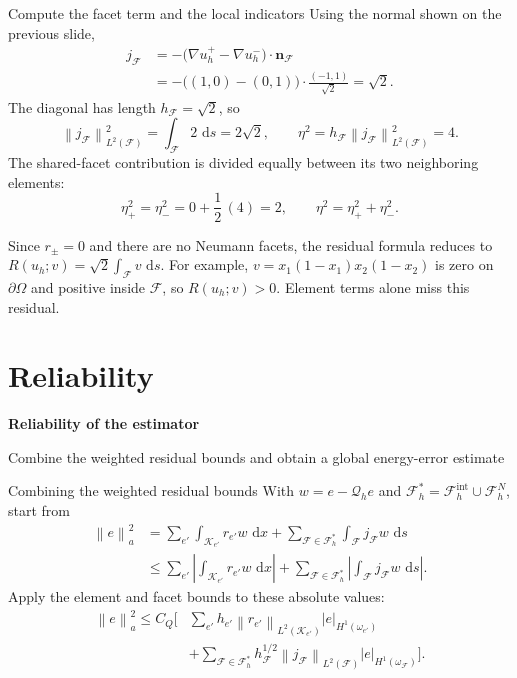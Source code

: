 \documentclass[11pt,aspectratio=169]{beamer}
\newcommand{\dd}{\,\mathrm{d}}
\newcommand{\Om}{\Omega}
\newcommand{\Fh}{\mathcal F_h}
\newcommand{\Qh}{\mathcal Q_h}
\newcommand{\norm}[2][]{\left\lVert#2\right\rVert_{#1}}
\newcommand{\seminorm}[2][]{\left\lvert#2\right\rvert_{#1}}
\newcommand{\grad}{\nabla}
\newcommand{\bn}{\bm n}
\begin{document}
\begin{frame}{Compute the facet term and the local indicators}
Using the normal shown on the previous slide,
\[
\begin{aligned}
  j_{\mathcal F}
  &=-\bigl(\grad u_h^+-\grad u_h^-\bigr)\cdot\bn_{\mathcal F} \\
  &=-\bigl((1,0)-(0,1)\bigr)\cdot
      \frac{(-1,1)}{\sqrt2}
   =\sqrt2.
\end{aligned}
\]
The diagonal has length $h_{\mathcal F}=\sqrt2$, so
\[
  \norm[L^2(\mathcal F)]{j_{\mathcal F}}^2
  =\int_{\mathcal F}2\,\dd s=2\sqrt2,
  \qquad
  \eta^2=h_{\mathcal F}
  \norm[L^2(\mathcal F)]{j_{\mathcal F}}^2=4.
\]
The shared-facet contribution is divided equally between its two neighboring
elements:
\[
  \eta_+^2=\eta_-^2=0+\frac12\,(4)=2,
  \qquad
  \eta^2=\eta_+^2+\eta_-^2.
\]

Since $r_\pm=0$ and there are no Neumann facets, the residual formula reduces
to $R(u_h;v)=\sqrt2\int_{\mathcal F}v\,\dd s$. For example,
$v=x_1(1-x_1)x_2(1-x_2)$ is zero on $\partial\Om$ and positive inside
$\mathcal F$, so $R(u_h;v)>0$. Element terms alone miss this residual.
\end{frame}

\section{Reliability}

\begin{frame}[plain]
  \centering\vfill
  {\LARGE\bfseries Reliability of the estimator\par}
  \vspace{0.4cm}
  {\large Combine the weighted residual bounds and obtain a global
  energy-error estimate\par}
  \vfill
\end{frame}

\begin{frame}{Combining the weighted residual bounds}
With $w=e-\Qh e$ and $\Fh^\ast=\Fh^{\mathrm{int}}\cup\Fh^N$, start from
\[
\begin{aligned}
 \norm[a]{e}^2
 &=\sum_{e'}\int_{\mathcal K_{e'}}r_{e'}w\,\dd x
   +\sum_{\mathcal F\in\Fh^\ast}\int_{\mathcal F}j_{\mathcal F}w\,\dd s\\
 &\leq\sum_{e'}\left|\int_{\mathcal K_{e'}}r_{e'}w\,\dd x\right|
   +\sum_{\mathcal F\in\Fh^\ast}
                  \left|\int_{\mathcal F}j_{\mathcal F}w\,\dd s\right|.
\end{aligned}
\]
Apply the element and facet bounds to these absolute values:
\[
\begin{aligned}
 \norm[a]{e}^2\leq C_Q\Bigg[&
 \sum_{e'} h_{e'}\norm[L^2(\mathcal K_{e'})]{r_{e'}}
          \seminorm[H^1(\omega_{e'})]{e}\\[3pt]
 &+\sum_{\mathcal F\in\Fh^\ast}h_{\mathcal F}^{1/2}
 \norm[L^2(\mathcal F)]{j_{\mathcal F}}
 \seminorm[H^1(\omega_{\mathcal F})]{e}\Bigg].
\end{aligned}
\]
\end{frame}
\end{document}

